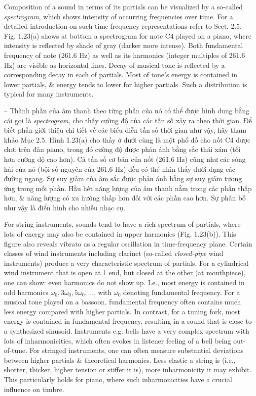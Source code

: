 \documentclass{article}
\begin{document}
\begin{itemize}
\begin{itemize}
\begin{itemize}
			Composition of a sound in terms of its partials can be visualized by a so-called {\it spectrogram}, which shows intensity of occurring frequencies over time. For a detailed introduction on such time-frequency representations refer to Sect. 2.5. {\sf Fig. 1.23(a)} shows at bottom a spectrogram for note C4 played on a piano, where intensity is reflected by shade of gray (darker more intense). Both fundamental frequency of note (261.6 Hz) as well as its harmonics (integer multiples of 261.6 Hz) are visible as horizontal lines. Decay of musical tone is reflected by a corresponding decay in each of partials. Most of tone's energy is contained in lower partials, \& energy tends to lower for higher partials. Such a distribution is typical for many instruments.
			
			-- Thành phần của âm thanh theo từng phần của nó có thể được hình dung bằng cái gọi là {\it spectrogram}, cho thấy cường độ của các tần số xảy ra theo thời gian. Để biết phần giới thiệu chi tiết về các biểu diễn tần số thời gian như vậy, hãy tham khảo Mục 2.5. {\sf Hình 1.23(a)} cho thấy ở dưới cùng là một phổ đồ cho nốt C4 được chơi trên đàn piano, trong đó cường độ được phản ánh bằng sắc thái xám (tối hơn cường độ cao hơn). Cả tần số cơ bản của nốt (261,6 Hz) cũng như các sóng hài của nó (bội số nguyên của 261,6 Hz) đều có thể nhìn thấy dưới dạng các đường ngang. Sự suy giảm của âm sắc được phản ánh bằng sự suy giảm tương ứng trong mỗi phần. Hầu hết năng lượng của âm thanh nằm trong các phần thấp hơn, \& năng lượng có xu hướng thấp hơn đối với các phần cao hơn. Sự phân bố như vậy là điển hình cho nhiều nhạc cụ.
			
			For string instruments, sounds tend to have a rich spectrum of partials, where lots of energy may also be contained in upper harmonics ({\sf Fig. 1.23(b)}). This figure also reveals vibrato as a regular oscillation in time-frequency plane. Certain classes of wind instruments including clarinet (so-called {\it closed-pipe} wind instruments) produce a very characteristic spectrum of partials. For a cylindrical wind instrument that is open at 1 end, but closed at the other (at mouthpiece), one can show: even harmonics do not show up. I.e., most energy is contained in odd harmonics $\omega_0,3\omega_0,5\omega_0,\ldots$, with $\omega_0$ denoting fundamental frequency. For a musical tone played on a bassoon, fundamental frequency often contains much less energy compared with higher partials. In contrast, for a tuning fork, most energy is contained in fundamental frequency, resulting in a sound that is close to a synthesized sinusoid. Instruments e.g. bells have a very complex spectrum with lots of inharmonicities, which often evokes in listener feeling of a bell being out-of-tune. For stringed instruments, one can often measure substantial deviations between higher partials \& theoretical harmonics. Less elastic a string is (i.e., shorter, thicker, higher tension or stiffer it is), more inharmonicity it may exhibit. This particularly holds for piano, where such inharmonicities have a crucial influence on timbre.
			

\end{itemize}
\end{itemize}
\end{itemize}
\end{document}
